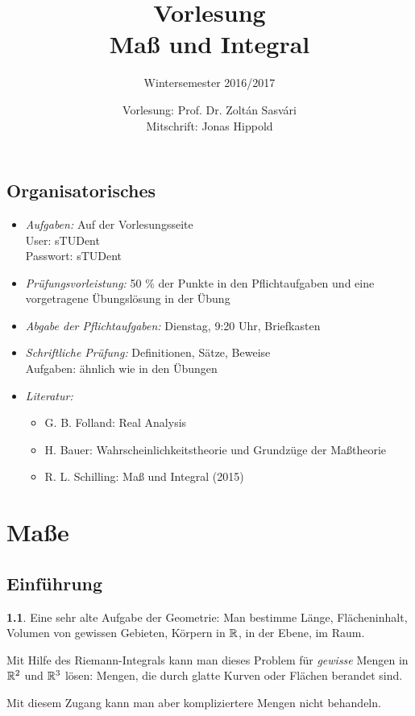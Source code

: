 \documentclass[
 a4paper,
 12pt,
 parskip=half
 ]{scrreprt}
\title{Vorlesung\\Maß und Integral}
\subtitle{Wintersemester 2016/2017}
\author{Vorlesung: Prof. Dr. Zoltán Sasvári\\Mitschrift: Jonas Hippold}
\theoremstyle{plain}
\theoremstyle{definition}
\newtheorem{exmp}[thm]{} %
\numberwithin{equation}{section}
\begin{document}
\maketitle

\tableofcontents

\section*{Organisatorisches}
 \begin{itemize}
  \item \emph{Aufgaben:} Auf der Vorlesungsseite \\
   User: sTUDent \\
   Passwort: sTUDent
  \item \emph{Prüfungsvorleistung:} 50 \% der Punkte in den Pflichtaufgaben und eine vorgetragene Übungslösung in der Übung
  \item \emph{Abgabe der Pflichtaufgaben:} Dienstag, 9:20 Uhr, Briefkasten 
  \item \emph{Schriftliche Prüfung:} Definitionen, Sätze, Beweise \\
   Aufgaben: ähnlich wie in den Übungen
  \item \emph{Literatur:}
   \begin{itemize}
    \item G. B. Folland: Real Analysis
    \item H. Bauer: Wahrscheinlichkeitstheorie und Grundzüge der Maßtheorie
    \item R. L. Schilling: Maß und Integral (2015)
   \end{itemize}
 \end{itemize}

\chapter{Maße}
\section{Einführung}
\begin{exmp}
 Eine sehr alte Aufgabe der Geometrie: Man bestimme Länge, Flächeninhalt, Volumen von gewissen Gebieten, Körpern in $\mathbb{R}$, in der Ebene, im Raum.
 
 Mit Hilfe des Riemann-Integrals kann man dieses Problem für \emph{gewisse} Mengen in $\mathbb{R}^2$ und $\mathbb{R}^3$ lösen: Mengen, die durch glatte Kurven oder Flächen berandet sind.
 
 Mit diesem Zugang kann man aber kompliziertere Mengen nicht behandeln.
\end{exmp}
 
\end{document}

